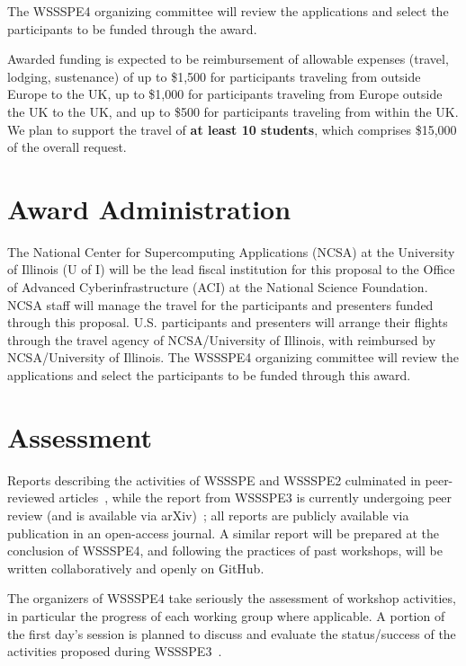 \documentclass[11pt]{article}
\begin{document}
The WSSSPE4 organizing committee will review the applications and select the participants to be funded through the award. 

Awarded funding is expected to be reimbursement of allowable expenses (travel, lodging, sustenance) of up to \$1,500 for participants traveling from outside Europe to the UK, up to \$1,000 for participants traveling from Europe outside the UK to the UK, and up to \$500 for participants traveling from within the UK.
We plan to support the travel of \textbf{at least 10 students}, which comprises \$15,000 of the overall request.

\section{Award Administration}

The National Center for Supercomputing Applications (NCSA) at the University of Illinois (U of I) will be the lead fiscal institution for this proposal to the Office of Advanced Cyberinfrastructure (ACI) at the National Science Foundation. NCSA staff will manage the travel for the participants and presenters funded through this proposal. U.S. participants and presenters will arrange their flights through the travel agency of NCSA/University of Illinois, with reimbursed by NCSA/University of Illinois. The WSSSPE4 organizing committee will review the applications and select the participants to be funded through this award. 

\section{Assessment}

Reports describing the activities of WSSSPE and WSSSPE2 culminated in peer-reviewed articles~\cite{WSSSPE1,WSSSPE2}, while the report from WSSSPE3 is currently undergoing peer review (and is available via arXiv)~\cite{WSSSPE3}; all reports are publicly available via publication in an open-access journal.
A similar report will be prepared at the conclusion of WSSSPE4, and following the practices of past workshops, will be written collaboratively and openly on GitHub.

The organizers of WSSSPE4 take seriously the assessment of workshop activities, in particular the progress of each working group where applicable.
A portion of the first day's session is planned to discuss and evaluate the status\slash success of the activities proposed during WSSSPE3~\cite{WSSSPE3}.
\end{document}
